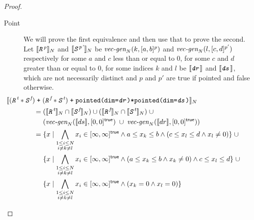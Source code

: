 \documentclass{article}
\theoremstyle{definition}
\theoremstyle{plain}
\newcommand{\interp}[1]{\llbracket {#1} \rrbracket}
\newcommand{\interv}[3]{\textnormal{$\lbrack#1,#2\rbrack^{#3}$}}
\newcommand{\vecgen}[3]{\textnormal{$\textit{vec-gen}_{#1}(#2,#3)$}}
\newcommand{\textcap}[1]{\texttt{\textit{#1}}}
\begin{document}
\begin{proof}
\begin{description}
    \item[Point] We will prove the first equivalence and then use that to prove
      the second.
%
      Let $\interp{\textcap{R}^{\textnormal{\textit{p}}}}_N$ and
      $\interp{\textcap{S}^{\textnormal{\textit{p'}}}}_N$ be
      $\vecgen{N}{k}{\interv{a}{b}{p}}$ and $\vecgen{N}{l}{\interv{c}{d}{p'}}$
      respectively for some $a$ and $c$ less than or equal to 0, for some $c$
      and $d$ greater than or equal to 0, for some indices $k$ and $l$ be
      $\interp{\textcap{dr}}$ and $\interp{\textcap{ds}}$, which are not
      necessarily distinct and $p$ and $p'$ are \textsf{true} if pointed and
      \textsf{false} otherwise.
%
      \begin{align*}
        \hspace{2em&\hspace{-2em}}
        \interp
          {{(\textcap{R}^{\textit{t}} * \textcap{S}^{\textit{f}})}
           \;\texttt{+}\;
           {(\textcap{R}^{\textit{f}} * \textcap{S}^{\textit{t}})}
           \;\texttt{+}\;
           \texttt{pointed(dim=\textcap{dr})*pointed(dim=\textcap{ds})}}_N \\
        & = {(\interp{\textcap{R}^{\textit{t}}}_N \cap
              \interp{\textcap{S}^{\textit{f}}}_N)} \cup
            {(\interp{\textcap{R}^{\textit{f}}}_N \cap
              \interp{\textcap{S}^{\textit{t}}}_N)} \;\cup \\
        & \quad\,\, {(\vecgen{N}{\interp{ds}}{\interv{0}{0}{\textsf{true}}}
                      \;\cup\;
                      \vecgen{N}{\interp{dr}}{\interv{0}{0}{\textsf{true}}})} \\
        & = \{ x \mid
            \bigwedge_{\substack{1 \leq i \leq N \\ i \neq k \neq l}} x_i \in
              \interv{\infty}{\infty}{\textsf{true}}
            \wedge a \leq x_k \leq b
            \wedge {(c \leq x_l \leq d \wedge x_l \neq 0)} \} \;\cup \\
        & \quad\,\, \{ x \mid
            \bigwedge_{\substack{1 \leq i \leq N \\ i \neq k \neq l}} x_i \in
              \interv{\infty}{\infty}{\textsf{true}}
            \wedge {(a \leq x_k \leq b \wedge x_k \neq 0)}
            \wedge c \leq x_l \leq d \} \;\cup \\
        & \quad\,\, \{ x \mid
            \bigwedge_{\substack{1 \leq i \leq N \\ i \neq k \neq l}} x_i \in
              \interv{\infty}{\infty}{\textsf{true}}
            \wedge (x_k = 0 \wedge x_l = 0) \} \\

\end{align*}
\end{description}
\end{proof}
\end{document}
